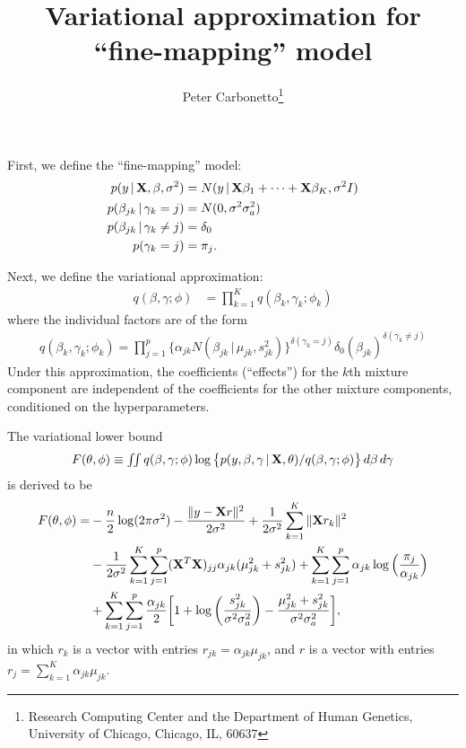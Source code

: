 \documentclass[final]{siamltex}
\title{Variational approximation for ``fine-mapping'' model}
\author{Peter Carbonetto\thanks{Research Computing Center and the
    Department of Human Genetics, University of Chicago, Chicago, IL,
    60637}}
\begin{document}
\maketitle

\noindent First, we define the ``fine-mapping'' model:
\begin{align*}
p(y \, |\, {\bf X}, \beta, \sigma^2) &=
  N(y \,|\, {\bf X}\beta_1 + \cdots + {\bf X}\beta_K, \sigma^2I) \\
p(\beta_{jk} \,|\, \gamma_k = j) &= N(0, \sigma^2 \sigma_a^2) \\
p(\beta_{jk} \,|\, \gamma_k \neq j) &= \delta_0 \\
p(\gamma_k = j) &= \pi_j.
\end{align*}

Next, we define the variational approximation:
\begin{align*}
q(\beta, \gamma; \phi) &= \prod_{k=1}^K q(\beta_k, \gamma_k; \phi_k)
\end{align*}
where the individual factors are of the form
\begin{align*}
q(\beta_k, \gamma_k; \phi_k) =
  \prod_{j=1}^p \big\{ \alpha_{jk}
    N(\beta_{jk} \,|\, \mu_{jk}, s_{jk}^2) \big\}^{\delta(\gamma_k = j)}
    \delta_0(\beta_{jk})^{\delta(\gamma_k \neq j)}
\end{align*}
Under this approximation, the coefficients (``effects'') for the $k$th
mixture component are independent of the coefficients for the other
mixture components, conditioned on the hyperparameters.

The variational lower bound
\begin{equation*}
F(\theta, \phi) \equiv \textstyle \iint q(\beta,
\gamma; \phi) \log \big\{ p(y, \beta, \gamma \,|\, {\bf X}, \theta) /
q(\beta, \gamma; \phi) \big\} \, d\beta \, d\gamma
\end{equation*}
is derived to be
\begin{align*}
F(\theta, \phi) =& -\frac{n}{2}\log(2\pi\sigma^2)
  - \frac{\|y - {\bf X}r\|^2}{2\sigma^2}
  + \frac{1}{2\sigma^2} \sum_{k=1}^K \|{\bf X}r_k \|^2 \\
  & - \frac{1}{2\sigma^2} \sum_{k=1}^K \sum_{j=1}^p ({\bf X}^T{\bf X})_{jj}
    \alpha_{jk}(\mu_{jk}^2 + s_{jk}^2) 
  + \sum_{k=1}^K \sum_{j=1}^p \alpha_{jk}
    \log \Big(\frac{\pi_j}{\alpha_{jk}} \Big) \\
  & + \sum_{k=1}^K \sum_{j=1}^p \frac{\alpha_{jk}}{2}
    \bigg[1 + \log\bigg(\frac{s_{jk}^2}{\sigma^2\sigma_a^2}\bigg)
            - \frac{\mu_{jk}^2 + s_{jk}^2}{\sigma^2\sigma_a^2}\bigg],
\end{align*}
in which $r_k$ is a vector with entries $r_{jk} = \alpha_{jk} \mu_{jk}$,
and $r$ is a vector with entries $r_j = \sum_{k=1}^K \alpha_{jk}
\mu_{jk}$.
\end{document}

